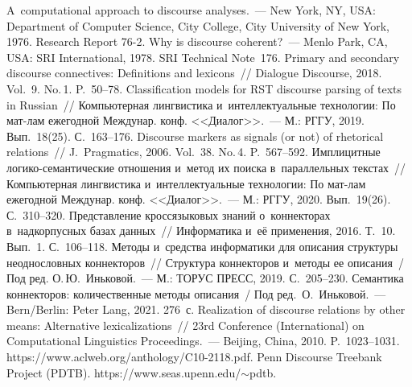 \begin{multicols}{2}
{\small\frenchspacing
{%
\begin{thebibliography}{99}
 A~computational approach to discourse analyses.~--- 
New York, NY, USA: Department of Computer Science, City College, City University of New 
York, 1976.  Research Report 76-2.
 Why is discourse coherent?~--- Menlo Park, CA, 
USA: SRI International, 1978.  SRI Technical Note~176.
 Primary 
and secondary discourse connectives: Definitions and lexicons~// Dialogue Discourse, 2018. 
Vol.~9. No.\,1. P.~50--78.
 Classification models for RST discourse parsing of texts in Russian~// 
Компьютерная лингвистика и~интеллектуальные технологии: По мат-лам ежегодной 
Междунар. конф. <<Диалог>>.~--- М.: РГГУ, 2019. Вып.~18(25). С.~163--176.
 Discourse markers as signals (or not) of rhetorical relations~// J.~Pragmatics, 
2006. Vol.~38. No.\,4. P.~567--592.
 Имплицитные логико-се\-ман\-ти\-че\-ские отношения 
и~метод их поиска в~параллельных текстах~// Компьютерная лингвистика 
и~интеллектуальные технологии: По мат-лам ежегодной Междунар. конф.  
<<Диалог>>.~--- М.: РГГУ, 2020. Вып.~19(26). С.~310--320.
 Представление 
кроссязыковых знаний о~коннекторах в~надкорпусных базах данных~// Информатика и~её 
применения, 2016. Т.~10. Вып.~1. С.~106--118.
 Методы и~средства информатики для 
описания структуры неоднословных коннекторов~// Структура коннекторов и~методы ее 
описания~/ Под ред. О.\,Ю.~Иньковой.~--- М.: ТОРУС ПРЕСС, 2019. С.~205--230.
Семантика коннекторов: количественные методы описания~/
Под ред.\ О.~Иньковой.~--- Bern/Berlin: Peter Lang, 2021. 276~с.
 Realization of discourse relations by other means: 
Alternative lexicalizations~// 23rd Conference (International) on Computational 
Linguistics Proceedings.~--- 
Beijing, China, 2010. P.~1023--1031. {\sf https://www.aclweb.org/anthology/C10-2118.pdf}.
Penn Discourse Treebank Project (PDTB). {\sf https://www.\linebreak seas.upenn.edu/$\sim$pdtb}.

\end{thebibliography}}}
\end{multicols}
